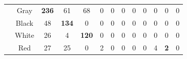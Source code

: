 \begin{table}[]
{\begin{tabular}{ccccccccccccc}
\multicolumn{1}{|l|}{}                                & \multicolumn{1}{c|}{Gray}      & \multicolumn{1}{c|}{\cellcolor[HTML]{32CB00}\textbf{236}} & \multicolumn{1}{c|}{61}                                   & \multicolumn{1}{c|}{68}                                   & \multicolumn{1}{c|}{0}                                  & \multicolumn{1}{c|}{0}                                  & \multicolumn{1}{c|}{0}                                  & \multicolumn{1}{c|}{0}                                  & \multicolumn{1}{c|}{0}                                  & \multicolumn{1}{c|}{0}                                  & \multicolumn{1}{c|}{0}                                  & \multicolumn{1}{c|}{0}                                  \\ \cline{2-13} 
\multicolumn{1}{|l|}{}                                & \multicolumn{1}{c|}{Black}     & \multicolumn{1}{c|}{48}                                   & \multicolumn{1}{c|}{\cellcolor[HTML]{32CB00}\textbf{134}} & \multicolumn{1}{c|}{0}                                    & \multicolumn{1}{c|}{0}                                  & \multicolumn{1}{c|}{0}                                  & \multicolumn{1}{c|}{0}                                  & \multicolumn{1}{c|}{0}                                  & \multicolumn{1}{c|}{0}                                  & \multicolumn{1}{c|}{0}                                  & \multicolumn{1}{c|}{0}                                  & \multicolumn{1}{c|}{0}                                  \\ \cline{2-13} 
\multicolumn{1}{|l|}{}                                & \multicolumn{1}{c|}{White}     & \multicolumn{1}{c|}{26}                                   & \multicolumn{1}{c|}{4}                                    & \multicolumn{1}{c|}{\cellcolor[HTML]{32CB00}\textbf{120}} & \multicolumn{1}{c|}{0}                                  & \multicolumn{1}{c|}{0}                                  & \multicolumn{1}{c|}{0}                                  & \multicolumn{1}{c|}{0}                                  & \multicolumn{1}{c|}{0}                                  & \multicolumn{1}{c|}{0}                                  & \multicolumn{1}{c|}{0}                                  & \multicolumn{1}{c|}{0}                                  \\ \cline{2-13} 
\multicolumn{1}{|l|}{}                                & \multicolumn{1}{c|}{Red}       & \multicolumn{1}{c|}{27}                                   & \multicolumn{1}{c|}{25}                                   & \multicolumn{1}{c|}{0}                                    & \multicolumn{1}{c|}{2}                                  & \multicolumn{1}{c|}{0}                                  & \multicolumn{1}{c|}{0}                                  & \multicolumn{1}{c|}{0}                                  & \multicolumn{1}{c|}{0}                                  & \multicolumn{1}{c|}{4}                                  & \multicolumn{1}{c|}{\cellcolor[HTML]{FE0000}\textbf{2}} & \multicolumn{1}{c|}{0}                                  \\ \cline{2-13} 

\end{tabular}}
\end{table}
